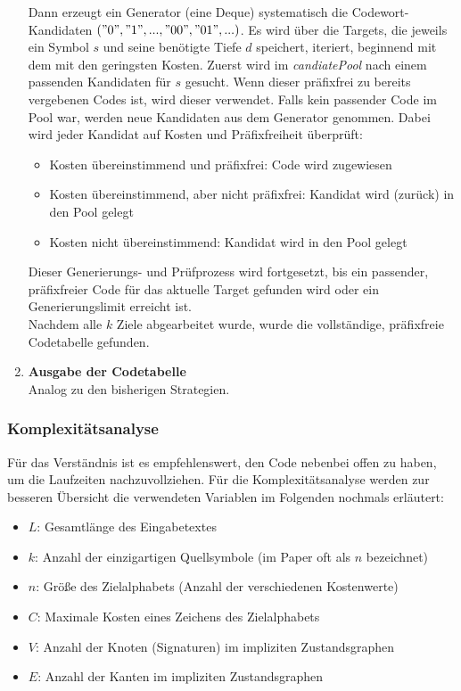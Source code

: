 \documentclass[a4paper,10pt,ngerman]{scrartcl}
\begin{document}
\begin{enumerate}
  Dann erzeugt ein Generator (eine Deque) systematisch die Codewort-Kandidaten $("0", "1", ..., "00",\\ "01", ...)$. Es wird über die Targets, die jeweils ein Symbol $s$ und seine benötigte Tiefe $d$ speichert, iteriert, beginnend mit dem mit den geringsten Kosten. Zuerst wird im \textit{candiatePool} nach einem passenden Kandidaten für $s$ gesucht. Wenn dieser präfixfrei zu bereits vergebenen Codes ist, wird dieser verwendet. Falls kein passender Code im Pool war, werden neue Kandidaten aus dem Generator genommen. Dabei wird jeder Kandidat auf Kosten und Präfixfreiheit überprüft: 
  \begin{itemize}
    \item Kosten übereinstimmend und präfixfrei: Code wird zugewiesen 
    \item Kosten übereinstimmend, aber nicht präfixfrei: Kandidat wird (zurück) in den Pool gelegt 
    \item Kosten nicht übereinstimmend: Kandidat wird in den Pool gelegt 
  \end{itemize}
  Dieser Generierungs- und Prüfprozess wird fortgesetzt, bis ein passender, präfixfreier Code für das aktuelle Target gefunden wird oder ein Generierungslimit erreicht ist. 
  \\\newline
  Nachdem alle $k$ Ziele abgearbeitet wurde, wurde die vollständige, präfixfreie Codetabelle gefunden. 
  \item \textbf{Ausgabe der Codetabelle} \\
  Analog zu den bisherigen Strategien.
  
\end{enumerate}

\subsubsection{Komplexitätsanalyse}
Für das Verständnis ist es empfehlenswert, den Code nebenbei offen zu haben, um die Laufzeiten nachzuvollziehen. Für die Komplexitätsanalyse werden zur besseren Übersicht die verwendeten Variablen im Folgenden nochmals erläutert:
\begin{itemize}
  \item $L$: Gesamtlänge des Eingabetextes
  \item $k$: Anzahl der einzigartigen Quellsymbole (im Paper oft als $n$ bezeichnet)
  \item $n$: Größe des Zielalphabets (Anzahl der verschiedenen Kostenwerte)
  \item $C$: Maximale Kosten eines Zeichens des Zielalphabets
  \item $V$: Anzahl der Knoten (Signaturen) im impliziten Zustandsgraphen
  \item $E$: Anzahl der Kanten im impliziten Zustandsgraphen
\end{itemize}
\end{document}
